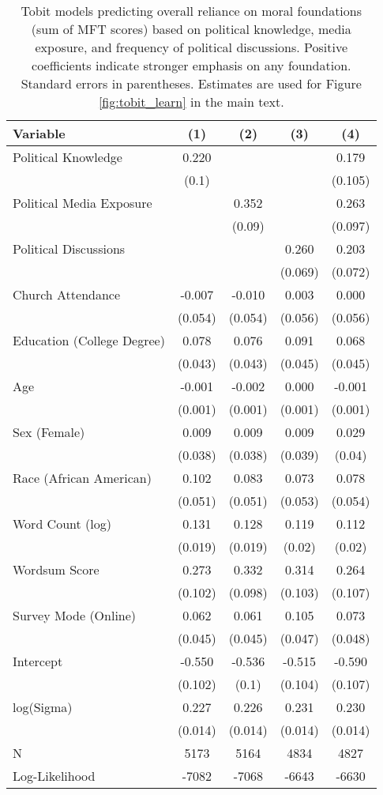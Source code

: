 \begin{table}[ht]
\centering
\caption{Tobit models predicting overall reliance on moral foundations
           (sum of MFT scores) based on political knowledge, media exposure, and frequency of 
           political discussions. Positive coefficients indicate stronger emphasis on any foundation.
           Standard errors in parentheses. Estimates are used for Figure \ref{fig:tobit_learn} in 
           the main text.} 
\label{tab:tobit_learn}
\begingroup\footnotesize
\begin{tabular}{lcccc}
  \hline
Variable & (1) & (2) & (3) & (4) \\ 
  \hline
Political Knowledge &  0.220 &  &  &  0.179 \\ 
   & (0.1) &  &  & (0.105) \\ 
  Political Media Exposure &  &  0.352 &  &  0.263 \\ 
   &  & (0.09) &  & (0.097) \\ 
  Political
Discussions &  &  &  0.260 &  0.203 \\ 
   &  &  & (0.069) & (0.072) \\ 
  Church Attendance & -0.007 & -0.010 &  0.003 &  0.000 \\ 
   & (0.054) & (0.054) & (0.056) & (0.056) \\ 
  Education (College Degree) &  0.078 &  0.076 &  0.091 &  0.068 \\ 
   & (0.043) & (0.043) & (0.045) & (0.045) \\ 
  Age & -0.001 & -0.002 &  0.000 & -0.001 \\ 
   & (0.001) & (0.001) & (0.001) & (0.001) \\ 
  Sex (Female) &  0.009 &  0.009 &  0.009 &  0.029 \\ 
   & (0.038) & (0.038) & (0.039) & (0.04) \\ 
  Race (African American) &  0.102 &  0.083 &  0.073 &  0.078 \\ 
   & (0.051) & (0.051) & (0.053) & (0.054) \\ 
  Word Count (log) &  0.131 &  0.128 &  0.119 &  0.112 \\ 
   & (0.019) & (0.019) & (0.02) & (0.02) \\ 
  Wordsum Score &  0.273 &  0.332 &  0.314 &  0.264 \\ 
   & (0.102) & (0.098) & (0.103) & (0.107) \\ 
  Survey Mode (Online) &  0.062 &  0.061 &  0.105 &  0.073 \\ 
   & (0.045) & (0.045) & (0.047) & (0.048) \\ 
  Intercept & -0.550 & -0.536 & -0.515 & -0.590 \\ 
   & (0.102) & (0.1) & (0.104) & (0.107) \\ 
  log(Sigma) &  0.227 &  0.226 &  0.231 &  0.230 \\ 
   & (0.014) & (0.014) & (0.014) & (0.014) \\ 
   \hline
N & 5173 & 5164 & 4834 & 4827 \\ 
  Log-Likelihood & -7082 & -7068 & -6643 & -6630 \\ 
   \hline
\end{tabular}
\endgroup
\end{table}

